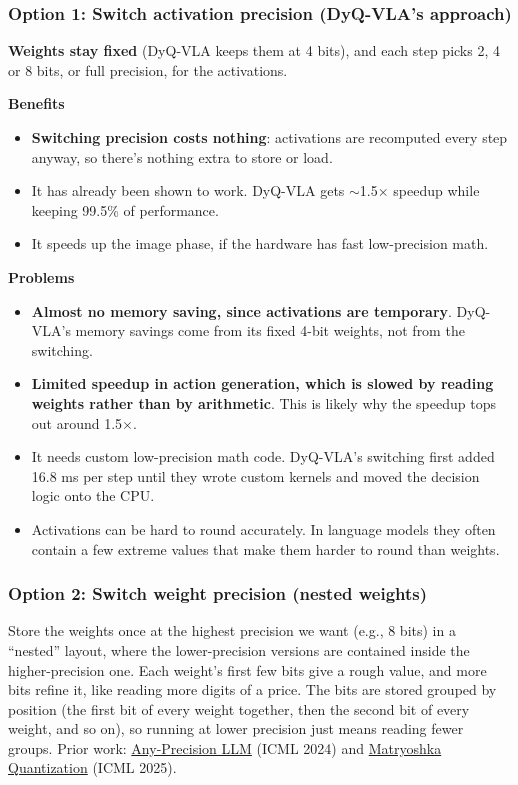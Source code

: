 \documentclass[11pt]{article}
\begin{document}
\subsubsection{Option 1: Switch activation precision (DyQ-VLA's approach)}\label{option-1-switch-activation-precision-dyq-vlas-approach}

\textbf{Weights stay fixed} (DyQ-VLA keeps them at 4 bits), and each step picks 2, 4 or 8 bits, or full precision, for the activations.

\textbf{Benefits}

\begin{itemize}
\item \textbf{Switching precision costs nothing}: activations are recomputed every step anyway, so there's nothing extra to store or load.
\item It has already been shown to work. DyQ-VLA gets $\sim$1.5$\times$ speedup while keeping 99.5\% of performance.
\item It speeds up the image phase, if the hardware has fast low-precision math.
\end{itemize}

\textbf{Problems}

\begin{itemize}
\item \textbf{Almost no memory saving, since activations are temporary}. DyQ-VLA's memory savings come from its fixed 4-bit weights, not from the switching.
\item \textbf{Limited speedup in action generation, which is slowed by reading weights rather than by arithmetic}. This is likely why the speedup tops out around 1.5$\times$.
\item It needs custom low-precision math code. DyQ-VLA's switching first added 16.8 ms per step until they wrote custom kernels and moved the decision logic onto the CPU.
\item Activations can be hard to round accurately. In language models they often contain a few extreme values that make them harder to round than weights.
\end{itemize}

\subsubsection{Option 2: Switch weight precision (nested weights)}\label{option-2-switch-weight-precision-nested-weights}

Store the weights once at the highest precision we want (e.g., 8 bits) in a ``nested'' layout, where the lower-precision versions are contained inside the higher-precision one. Each weight's first few bits give a rough value, and more bits refine it, like reading more digits of a price. The bits are stored grouped by position (the first bit of every weight together, then the second bit of every weight, and so on), so running at lower precision just means reading fewer groups. Prior work: \href{https://arxiv.org/pdf/2402.10517}{Any-Precision LLM} (ICML 2024) and \href{https://arxiv.org/abs/2502.06786v2}{Matryoshka Quantization} (ICML 2025).
\end{document}
